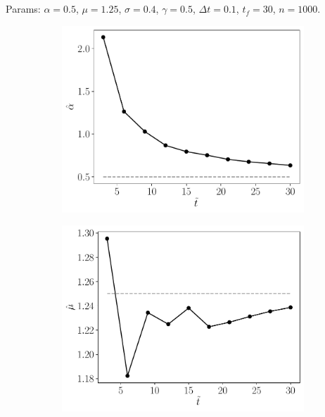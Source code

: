 \documentclass[11pt]{article}
\theoremstyle{definition}
\theoremstyle{remark}
\theoremstyle{remark}
\begin{document}
\section{}
Params: $\alpha = 0.5$, $\mu = 1.25$, $\sigma = 0.4$, $\gamma = 0.5$, $\Delta t = 0.1$, $t_f = 30$, $n = 1000$.
\begin{figure}[H]
  \centering
  \begin{subfigure}[b]{0.45\textwidth}
      \centering
      \includegraphics[scale=0.45]{alphas.pdf}
      \caption{}
  \end{subfigure}
  \begin{subfigure}[b]{0.45\textwidth}
      \centering
      \includegraphics[scale=0.45]{mus.pdf}

\end{subfigure}
\end{figure}
\end{document}
